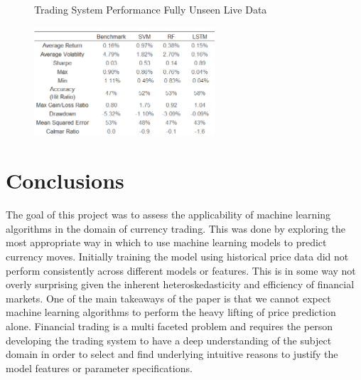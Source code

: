 \documentclass[11pt]{article}
\begin{document}
\begin{figure}[h]
    \centering
	\caption{Trading System Performance Fully Unseen Live Data}    
	\includegraphics[width=0.6\textwidth]{BLINDFULLSYSTEMRES_statsv2}
    \label{fig:BLINDFULLSYSTEMRES_stats}
     \caption*{}
\end{figure}


\clearpage


\section{Conclusions} \label{conclusions}

The goal of this project was to assess the applicability of machine learning algorithms in the domain of currency trading. This was done by exploring the most appropriate way in which to use machine learning models to predict currency moves. Initially training the model using historical price data did not perform consistently across different models or features. This is in some way not overly surprising given the inherent heteroskedasticity and efficiency of financial markets. One of the main takeaways of the paper is that we cannot expect machine learning algorithms to perform the heavy lifting of price prediction alone. Financial trading is a multi faceted problem and requires the person developing the trading system to have a deep understanding of the subject domain in order to select and find underlying intuitive reasons to justify the model features or parameter specifications. 
\vspace{4mm}
\end{document}
